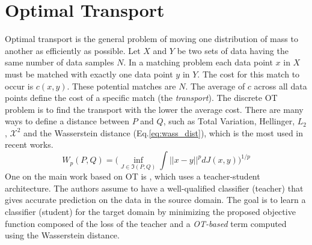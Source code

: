 \section{Optimal Transport}
Optimal transport is the general problem of moving one distribution of mass to another as efficiently as possible. Let $X$ and $Y$ be two sets of data  having the same number of data samples $N$. In a matching problem each data point $x$ in $X$ must be matched with exactly one data point $y$ in $Y$. The cost  for this match to occur is $c(x,y)$. These potential matches are $N$. The average of $c$ across all data points define the cost of a specific match (the \emph{transport}). The discrete OT problem is to find the transport with the lower the average cost.
There are many ways to define a distance between $P$ and $Q$, such as Total Variation, Hellinger, $L_2$, $\mathcal{X}^2$ and the Wasserstein distance (Eq.\ref{eq:wass_dist}), which is the most used in recent works.
\begin{equation}
\label{eq:wass_dist}
    W_p(P,Q)= \bigg( \inf_{J\in\Im(P,Q)}\int||x-y||^pdJ(x,y) \bigg)^{1/p}
\end{equation}
One on the main work based on OT is \cite[Nguyen et al.]{nguyen2021}, which uses a teacher-student architecture. The authors assume to have a well-qualified classifier (teacher) that gives accurate prediction on the data in the source domain. The goal is to learn a classifier (student) for the target domain by minimizing the proposed objective function composed of the loss of the teacher and a \emph{OT-based} term computed using the Wasserstein distance.
